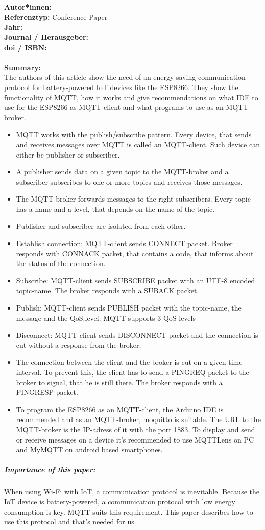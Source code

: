 \documentclass{report}
\newcommand{\createConferencePaperHeader}[1]{
    {\let\clearpage\relax \chapter{\citetitle{#1}}}
    \noindent
    \textbf{Autor*innen:} \citeauthor{#1} \\
    \textbf{Referenztyp:} Conference Paper\\
    \textbf{Jahr:} \citeyear{#1} \\
    \textbf{Journal / Herausgeber:} \citelist{#1}{publisher}\\
    \textbf{doi / ISBN:} \citefield{#1}{doi} \\\\
    \textbf{Summary:}\\
}
\begin{document}
\createConferencePaperHeader{kodali_mqtt_2016}
The authors of this article show the need of an energy-saving communication protocol for battery-powered IoT devices like the ESP8266.
They show the functionality of MQTT, how it works and give recommendations on what IDE to use for the ESP8266 as MQTT-client and what programs to use as an MQTT-broker.\\
\begin{itemize}
    \item MQTT works with the publish/subscribe pattern. Every device, that sends and receives messages over MQTT is called an MQTT-client. Such device can either be publisher or subscriber.
    \item A publisher sends data on a given topic to the MQTT-broker and a subscriber subscribes to one or more topics and receives those messages.
    \item The MQTT-broker forwards messages to the right subscribers. Every topic has a name and a level, that depends on the name of the topic.
    \item Publisher and subscriber are isolated from each other.
    \item Establish connection: MQTT-client sends CONNECT packet. Broker responds with CONNACK packet, that contains a code, that informs about the status of the connection.
    \item Subscribe: MQTT-client sends SUBSCRIBE packet with an UTF-8 encoded topic-name. The broker responds with a SUBACK packet.
    \item Publish: MQTT-client sends PUBLISH packet with the topic-name, the message and the QoS.level. MQTT supports 3 QoS-levels
    \item Disconnect: MQTT-client sends DISCONNECT packet and the connection is cut without a response from the broker.
    \item The connection between the client and the broker is cut on a given time interval. To prevent this, the client has to send a PINGREQ packet to the broker to signal, that he is still there. The broker responds with a PINGRESP packet.
    \item To program the ESP8266 as an MQTT-client, the Arduino IDE is recommended and as an MQTT-broker, moquitto is suitable. The URL to the MQTT-broker is the IP-adress of it with the port 1883. To display and send or receive messages on a device it's recommended to use MQTTLens on PC and MyMQTT on android  based smartphones.
\end{itemize}
\paragraph{Importance of this paper:}
When using Wi-Fi with IoT, a communication protocol is inevitable. Because the IoT device is battery-powered, a communication protocol with low energy consumption is key. MQTT suits this requirement. This paper describes how to use this protocol and that's needed for us.
\end{document}
